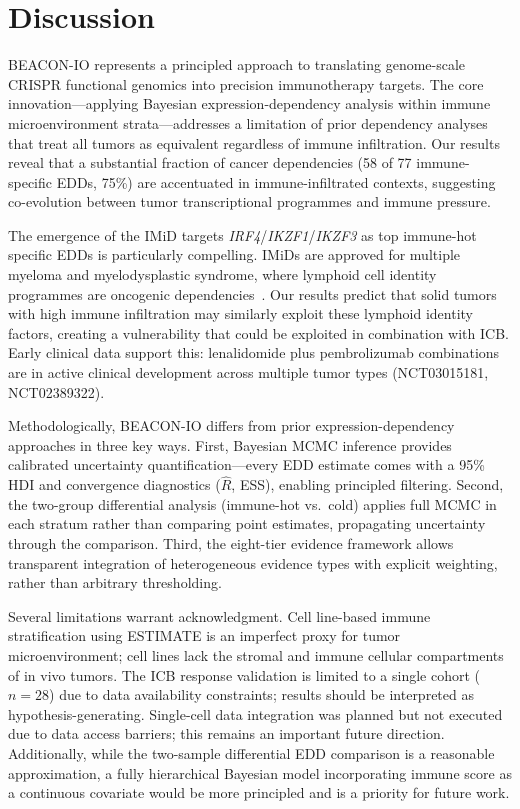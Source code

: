 \documentclass[12pt]{article}
\begin{document}
\section*{Discussion}

BEACON-IO represents a principled approach to translating genome-scale CRISPR functional genomics into precision immunotherapy targets. The core innovation---applying Bayesian expression-dependency analysis within immune microenvironment strata---addresses a limitation of prior dependency analyses that treat all tumors as equivalent regardless of immune infiltration. Our results reveal that a substantial fraction of cancer dependencies (58 of 77 immune-specific EDDs, 75\%) are accentuated in immune-infiltrated contexts, suggesting co-evolution between tumor transcriptional programmes and immune pressure.

The emergence of the IMiD targets \textit{IRF4}/\textit{IKZF1}/\textit{IKZF3} as top immune-hot specific EDDs is particularly compelling. IMiDs are approved for multiple myeloma and myelodysplastic syndrome, where lymphoid cell identity programmes are oncogenic dependencies~\citep{Kronke2014}. Our results predict that solid tumors with high immune infiltration may similarly exploit these lymphoid identity factors, creating a vulnerability that could be exploited in combination with ICB. Early clinical data support this: lenalidomide plus pembrolizumab combinations are in active clinical development across multiple tumor types (NCT03015181, NCT02389322).

Methodologically, BEACON-IO differs from prior expression-dependency approaches in three key ways. First, Bayesian MCMC inference provides calibrated uncertainty quantification---every EDD estimate comes with a 95\% HDI and convergence diagnostics ($\hat{R}$, ESS), enabling principled filtering. Second, the two-group differential analysis (immune-hot vs.\ cold) applies full MCMC in each stratum rather than comparing point estimates, propagating uncertainty through the comparison. Third, the eight-tier evidence framework allows transparent integration of heterogeneous evidence types with explicit weighting, rather than arbitrary thresholding.

Several limitations warrant acknowledgment. Cell line-based immune stratification using ESTIMATE is an imperfect proxy for tumor microenvironment; cell lines lack the stromal and immune cellular compartments of in vivo tumors. The ICB response validation is limited to a single cohort ($n = 28$) due to data availability constraints; results should be interpreted as hypothesis-generating. Single-cell data integration was planned but not executed due to data access barriers; this remains an important future direction. Additionally, while the two-sample differential EDD comparison is a reasonable approximation, a fully hierarchical Bayesian model incorporating immune score as a continuous covariate would be more principled and is a priority for future work.
\end{document}

